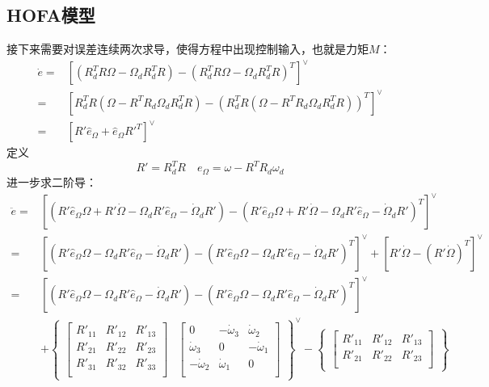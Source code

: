 \subsection*{HOFA模型}
接下来需要对误差连续两次求导，使得方程中出现控制输入，也就是力矩$M$：
$$\begin{aligned}
    \dot e=&[(R_d^TR \Omega-\Omega_dR_d^TR)-(R_d^TR \Omega-\Omega_dR_d^TR)^T]^\vee\\
    =&[R_d^TR(\Omega-R^TR_d \Omega_dR_d^TR)-(R_d^TR(\Omega-R^TR_d \Omega_dR_d^TR))^T]^\vee \\
    =&[R' \hat e_\Omega  + \hat e_\Omega R'^T]^\vee
\end{aligned} $$
    定义
    $$R'=R_d^TR \quad e_\Omega=\omega -R^TR_d \omega_d$$
进一步求二阶导：
    $$\begin{aligned}
        \ddot e =& [(R' \hat e_\Omega \Omega + R'\dot \Omega -\Omega_d R' \hat e_\Omega -\dot \Omega_d R')-(R' \hat e_\Omega \Omega + R'\dot \Omega -\Omega_d R' \hat e_\Omega -\dot \Omega_d R')^T]^\vee\\
        =&[(R' \hat e_\Omega \Omega  -\Omega_d R' \hat e_\Omega -\dot \Omega_d R')-(R' \hat e_\Omega \Omega  -\Omega_d R' \hat e_\Omega -\dot \Omega_d R')^T]^\vee+[R'\dot \Omega-(R'\dot \Omega)^T]^\vee\\
        =&[(R' \hat e_\Omega \Omega  -\Omega_d R' \hat e_\Omega -\dot \Omega_d R')-(R' \hat e_\Omega \Omega  -\Omega_d R' \hat e_\Omega -\dot \Omega_d R')^T]^\vee\\
        & + \begin{Bmatrix}
        \begin{bmatrix}
        R'_{11} &R'_{12}  & R'_{13} \\
        R'_{21} & R'_{22} & R'_{23} \\
        R'_{31} & R'_{32} &R'_{33}  \\
        \end{bmatrix}&\begin{bmatrix}
        0 & -\dot\omega_3 &\dot\omega_2  \\
         \dot\omega_3& 0 &  -\dot\omega_1\\
         -\dot\omega_2&\dot\omega_1  & 0 \\
        \end{bmatrix}\end{Bmatrix}^\vee -\begin{Bmatrix}
        \begin{bmatrix}
        R'_{11} &R'_{12}  & R'_{13} \\
        R'_{21} & R'_{22} & R'_{23} \\

\end{bmatrix}
\end{Bmatrix}
\end{aligned}$$
